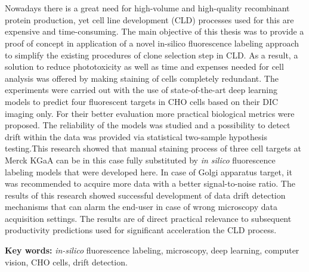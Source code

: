 \section*{}

Nowadays there is a great need for high-volume and high-quality recombinant protein production, yet cell line development (CLD) processes used for this are expensive and time-consuming. The main objective of this thesis was to provide a proof of concept in application of a novel in-silico fluorescence labeling approach to simplify the existing procedures of clone selection step in CLD. As a result, a solution to reduce phototoxicity as well as time and expenses needed for cell analysis was offered by making staining of cells completely redundant. The experiments were carried out with the use of state-of-the-art deep learning models to predict four fluorescent targets in CHO cells based on their DIC imaging only. For their better evaluation more practical biological metrics were proposed. The reliability of the models was studied and a possibility to detect drift within the data was provided via statistical two-sample hypothesis testing.This research showed that manual staining process of three cell targets at Merck KGaA can be in this case fully substituted by \textit{in silico} fluorescence labeling models that were developed here. In case of Golgi apparatus target, it was recommended to acquire more data with a better signal-to-noise ratio. The results of this research showed successful development of data drift detection mechanisms that can alarm the end-user in case of wrong microscopy data acquisition settings. The results are of direct practical relevance to subsequent productivity predictions used for significant acceleration the CLD process.

\textbf{Key words:} \textit{in-silico} fluorescence labeling, microscopy, deep learning, computer vision, CHO cells, drift detection.